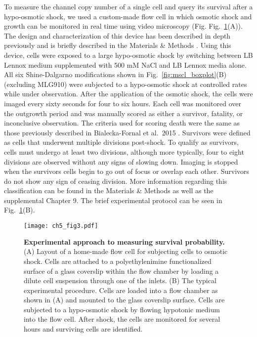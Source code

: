 \documentclass[12pt]{caltech_thesis}
\begin{document}
To measure the channel copy number of a single cell and query its
survival after a hypo-osmotic shock, we used a custom-made flow cell in
which osmotic shock and growth can be monitored in real time using video
microscopy (Fig. Fig.~\ref{fig:flow_cell}(A)). The design and
characterization of this device has been described in depth previously
and is briefly described in the Materials \& Methods
\autocite{bialecka-fornal2015}. Using this device, cells were exposed to
a large hypo-osmotic shock by switching between LB Lennox medium
supplemented with 500 mM NaCl and LB Lennox media alone. All six
Shine-Dalgarno modifications shown in Fig.~\ref{fig:mscl_boxplot}(B)
(excluding MLG910) were subjected to a hypo-osmotic shock at controlled
rates while under observation. After the application of the osmotic
shock, the cells were imaged every sixty seconds for four to six hours.
Each cell was monitored over the outgrowth period and was manually
scored as either a survivor, fatality, or inconclusive observation. The
criteria used for scoring death were the same as those previously
described in Bialecka-Fornal et al.~2015 \autocite{bialecka-fornal2015}.
Survivors were defined as cells that underwent multiple divisions
post-shock. To qualify as survivors, cells must undergo at least two
divisions, although more typically, four to eight divisions are observed
without any signs of slowing down. Imaging is stopped when the survivors
cells begin to go out of focus or overlap each other. Survivors do not
show any sign of ceasing division. More information regarding this
classification can be found in the Materials \& Methods as well as the
supplemental Chapter 9. The brief experimental protocol can be seen in
Fig.~\ref{fig:flow_cell}(B).

\hypertarget{fig:flow_cell}{%
\begin{figure}
\centering
\texttt{[image: ch5\_fig3.pdf]}
\caption[{Experimental approach to measuring survival
probability}]{\textbf{Experimental approach to measuring survival
probability.} (A) Layout of a home-made flow cell for subjecting cells
to osmotic shock. Cells are attached to a polyethylenimine
functionalized surface of a glass coverslip within the flow chamber by
loading a dilute cell suspension through one of the inlets. (B) The
typical experimental procedure. Cells are loaded into a flow chamber as
shown in (A) and mounted to the glass coverslip surface. Cells are
subjected to a hypo-osmotic shock by flowing hypotonic medium into the
flow cell. After shock, the cells are monitored for several hours and
surviving cells are identified.}
\label{fig:flow_cell}
\end{figure}
}
\end{document}
